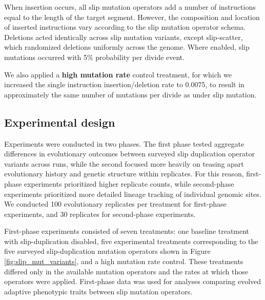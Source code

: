 When insertion occurs, all slip mutation operators add a number of instructions equal to the length of the target segment.
However, the composition and location of inserted instructions vary according to the slip mutation operator schema.
Deletions acted identically across slip mutation variants, except slip-scatter, which randomized deletions uniformly across the genome.
Where enabled, slip mutations occurred with 5\% probability per divide event.

We also applied a \textbf{high mutation rate} control treatment, for which we increased the single instruction insertion/deletion rate to 0.0075, to result in approximately the same number of mutations per divide as under slip mutation.

\subsection{Experimental design}

Experiments were conducted in two phases.
The first phase tested aggregate differences in evolutionary outcomes between surveyed slip duplication operator variants across runs, while the second focused more heavily on teasing apart evolutionary history and genetic structure within replicates.
For this reason, first-phase experiments prioritized higher replicate counts, while second-phase experiments prioritized more detailed lineage tracking of individual genomic sites.
We conducted 100 evolutionary replicates per treatment for first-phase experiments, and 30 replicates for second-phase experiments.

First-phase experiments consisted of seven treatments: one baseline treatment with slip-duplication disabled, five experimental treatments corresponding to the five surveyed slip-duplication mutation operators shown in Figure \ref{fig:slip_mut_variants}, and a high mutation rate control.
These treatments differed only in the available mutation operators and the rates at which those operators were applied.
First-phase data was used for analyses comparing evolved adaptive phenotypic traits between slip mutation operators.


